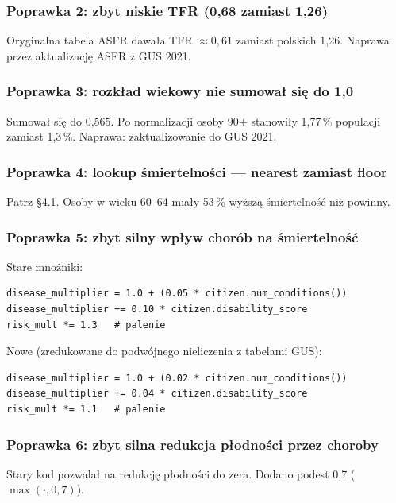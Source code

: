 \documentclass[11pt,a4paper]{article}
\begin{document}
\subsubsection{Poprawka 2: zbyt niskie TFR (0{,}68 zamiast 1{,}26)}

Oryginalna tabela ASFR dawała TFR $\approx 0{,}61$ zamiast polskich 1{,}26. Naprawa przez aktualizację ASFR z GUS 2021.

\subsubsection{Poprawka 3: rozkład wiekowy nie sumował się do 1{,}0}

Sumował się do 0{,}565. Po normalizacji osoby 90+ stanowiły 1{,}77\,\% populacji zamiast 1{,}3\,\%. Naprawa: zaktualizowanie do GUS 2021.

\subsubsection{Poprawka 4: lookup śmiertelności --- nearest zamiast floor}

Patrz \S 4.1. Osoby w wieku 60--64 miały 53\,\% wyższą śmiertelność niż powinny.

\subsubsection{Poprawka 5: zbyt silny wpływ chorób na śmiertelność}

Stare mnożniki:
\begin{lstlisting}
disease_multiplier = 1.0 + (0.05 * citizen.num_conditions())
disease_multiplier += 0.10 * citizen.disability_score
risk_mult *= 1.3   # palenie
\end{lstlisting}

Nowe (zredukowane do podwójnego nieliczenia z tabelami GUS):
\begin{lstlisting}
disease_multiplier = 1.0 + (0.02 * citizen.num_conditions())
disease_multiplier += 0.04 * citizen.disability_score
risk_mult *= 1.1   # palenie
\end{lstlisting}

\subsubsection{Poprawka 6: zbyt silna redukcja płodności przez choroby}

Stary kod pozwalał na redukcję płodności do zera. Dodano podest 0{,}7 ($\max(\cdot, 0{,}7)$).
\end{document}
